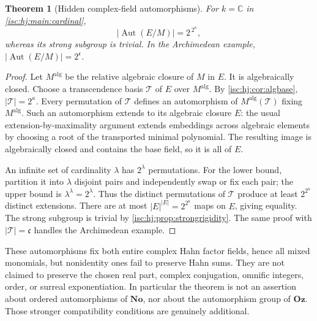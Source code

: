 \documentclass[11pt,letterpaper]{article}
\newtheorem{theorem}{Theorem}[section]
\theoremstyle{definition}
\theoremstyle{remark}
\newcommand{\No}{\mathbf{No}}
\newcommand{\Oz}{\mathbf{Oz}}
\newcommand{\C}{\mathbb C}
\newcommand{\cc}{\mathfrak c}
\numberwithin{equation}{section}
\begin{document}
\begin{theorem}[Hidden complex-field automorphisms]\label{isc:hj:thm:automorphisms}
For $k=\C$ in \cref{isc:hj:main:cardinal},
\[
 |\operatorname{Aut}(E/M)|=2^{\,2^\kappa},
\]
whereas its strong subgroup is trivial. In the Archimedean example,
$|\operatorname{Aut}(E/M)|=2^{\cc}$.
\end{theorem}
\begin{proof}
Let $M^{\mathrm{alg}}$ be the relative algebraic closure of $M$ in $E$.
It is algebraically closed. Choose a transcendence basis $\mathcal T$ of $E$
over $M^{\mathrm{alg}}$. By \cref{isc:hj:cor:algbase},
$|\mathcal T|=2^\kappa$. Every permutation of $\mathcal T$ defines an
automorphism of $M^{\mathrm{alg}}(\mathcal T)$ fixing $M^{\mathrm{alg}}$.
Such an automorphism extends to its algebraic closure $E$: the usual
extension-by-maximality argument extends embeddings across algebraic
elements by choosing a root of the transported minimal polynomial. The
resulting image is algebraically closed and contains the base field, so it
is all of $E$.

An infinite set of cardinality $\lambda$ has $2^\lambda$ permutations.
For the lower bound, partition it into $\lambda$ disjoint pairs and
independently swap or fix each pair; the upper bound is
$\lambda^\lambda=2^\lambda$. Thus the distinct permutations of $\mathcal T$
produce at least $2^{2^\kappa}$ distinct extensions. There are at most
$|E|^{|E|}=2^{2^\kappa}$ maps on $E$, giving equality.
The strong subgroup is trivial by \cref{isc:hj:prop:strongrigidity}.
The same proof with $|\mathcal T|=\cc$ handles the Archimedean example.
\end{proof}

These automorphisms fix both entire complex Hahn factor fields, hence
all mixed monomials, but nonidentity ones fail to preserve Hahn sums.
They are not claimed to preserve the chosen real part, complex
conjugation, omnific integers, order, or surreal exponentiation.
In particular the theorem is not an assertion about ordered
automorphisms of $\No$, nor about the automorphism group of $\Oz$.
Those stronger compatibility conditions are genuinely additional.
\end{document}
